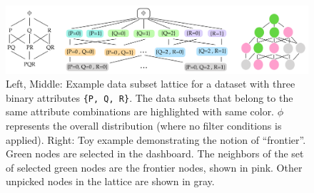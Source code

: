 \begin{figure}[ht!]
\includegraphics[width=\linewidth]{figures/lattice_frontier.png}
\caption{Left, Middle: Example data subset lattice for a dataset with three binary attributes {\tt \{P, Q, R\}}. The data subsets that belong to the same attribute combinations are highlighted with same color. $\phi$ represents the overall distribution (where no filter conditions is applied). Right: Toy example demonstrating the notion of ``frontier''. Green nodes are selected in the dashboard. The neighbors of the set of selected green nodes are the frontier nodes, shown in pink. Other unpicked nodes in the lattice are shown in gray.}
\label{fig:lattice}
\end{figure}




